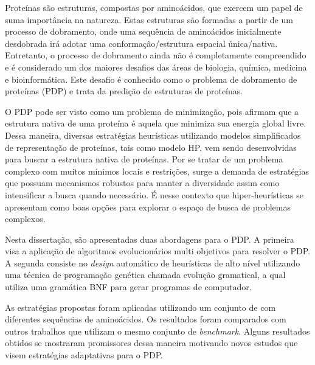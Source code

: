 \begin{resumo}


Proteínas são estruturas, compostas por aminoácidos, que exercem um papel de suma importância na natureza. Estas estruturas são formadas a partir de um processo de dobramento, onde uma sequência de aminoácidos inicialmente desdobrada irá adotar uma conformação/estrutura espacial única/nativa. Entretanto, o processo de dobramento ainda não é completamente compreendido e é considerado um dos maiores desafios das áreas de biologia, química, medicina e bioinformática. Este desafio é conhecido como o problema de dobramento de proteínas (PDP) e trata da predição de estruturas de proteínas. 

O PDP pode ser visto como um problema de minimização, pois afirmam que a estrutura nativa de uma proteína é aquela que minimiza sua energia global livre. Dessa maneira, diversas estratégias heurísticas utilizando modelos simplificados de representação de proteínas, tais como modelo HP, vem sendo desenvolvidas para buscar a estrutura nativa de proteínas. Por se tratar de um problema complexo com muitos mínimos locais e restrições, surge a demanda de estratégias que possuam mecanismos robustos para manter a diversidade assim como intensificar a busca quando necessário. É nesse contexto que hiper-heurísticas se apresentam como boas opções para explorar o espaço de busca de problemas complexos. 



Nesta dissertação, são apresentadas duas abordagens para o PDP. A primeira visa a aplicação de algoritmos evolucionários multi objetivos para resolver o PDP. A segunda consiste no \textit{design} automático de heurísticas de alto nível utilizando uma técnica de programação genética chamada evolução gramatical, a qual utiliza uma gramática BNF para gerar programas de computador. 

 As estratégias propostas foram aplicadas utilizando um conjunto de  com diferentes sequências de aminoácidos. Os resultados foram comparados com outros trabalhos que utilizam o mesmo conjunto de \textit{benchmark}. Alguns resultados obtidos se mostraram promissores dessa maneira motivando novos estudos que visem estratégias adaptativas para o PDP.



\end{resumo}

